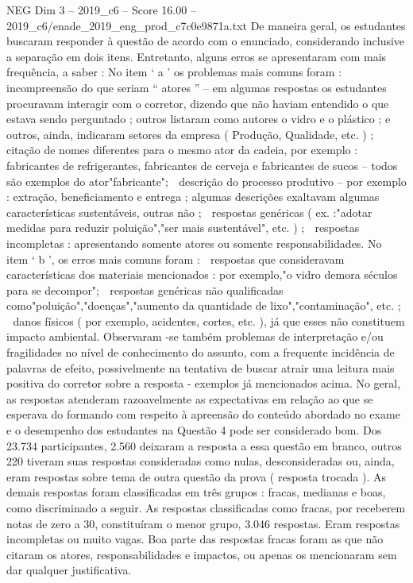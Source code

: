 \begin{textsample}{NEG Dim 3 – 2019\_c6 – Score 16.00 – 2019\_c6/enade\_2019\_eng\_prod\_c7c0e9871a.txt}
De maneira geral, os estudantes buscaram responder à questão de acordo com o enunciado, considerando inclusive a separação em dois itens.
Entretanto, alguns erros se apresentaram com mais frequência, a saber : No item ‘ a ’ os problemas mais comuns foram :  incompreensão do que seriam “ atores ” – em algumas respostas os estudantes procuravam interagir com o corretor, dizendo que não haviam entendido o que estava sendo perguntado ; outros listaram como autores o vidro e o plástico ; e outros, ainda, indicaram setores da empresa ( Produção, Qualidade, etc. ) ;  citação de nomes diferentes para o mesmo ator da cadeia, por exemplo : fabricantes de refrigerantes, fabricantes de cerveja e fabricantes de sucos – todos são exemplos do ator"fabricante";  descrição do processo produtivo – por exemplo : extração, beneficiamento e entrega ; algumas descrições exaltavam algumas características sustentáveis, outras não ;  respostas genéricas ( ex. :"adotar medidas para reduzir poluição","ser mais sustentável", etc. ) ;  respostas incompletas : apresentando somente atores ou somente responsabilidades.
No item ‘ b ’, os erros mais comuns foram :  respostas que consideravam características dos materiais mencionados : por exemplo,"o vidro demora séculos para se decompor";  respostas genéricas não qualificadas como"poluição","doenças","aumento da quantidade de lixo","contaminação", etc. ;  danos físicos ( por exemplo, acidentes, cortes, etc. ), já que esses não constituem impacto ambiental.
Observaram -se também problemas de interpretação e/ou fragilidades no nível de conhecimento do assunto, com a frequente incidência de palavras de efeito, possivelmente na tentativa de buscar atrair uma leitura mais positiva do corretor sobre a resposta - exemplos já mencionados acima.
No geral, as respostas atenderam razoavelmente as expectativas em relação ao que se esperava do formando com respeito à apreensão do conteúdo abordado no exame e o desempenho dos estudantes na Questão 4 pode ser considerado bom.
Dos 23.734 participantes, 2.560 deixaram a resposta a essa questão em branco, outros 220 tiveram suas respostas consideradas como nulas, desconsideradas ou, ainda, eram respostas sobre tema de outra questão da prova ( resposta trocada ).
As demais respostas foram classificadas em três grupos : fracas, medianas e boas, como discriminado a seguir.
As respostas classificadas como fracas, por receberem notas de zero a 30, constituíram o menor grupo, 3.046 respostas.
Eram respostas incompletas ou muito vagas.
Boa parte das respostas fracas foram as que não citaram os atores, responsabilidades e impactos, ou apenas os mencionaram sem dar qualquer justificativa.

\end{textsample}
